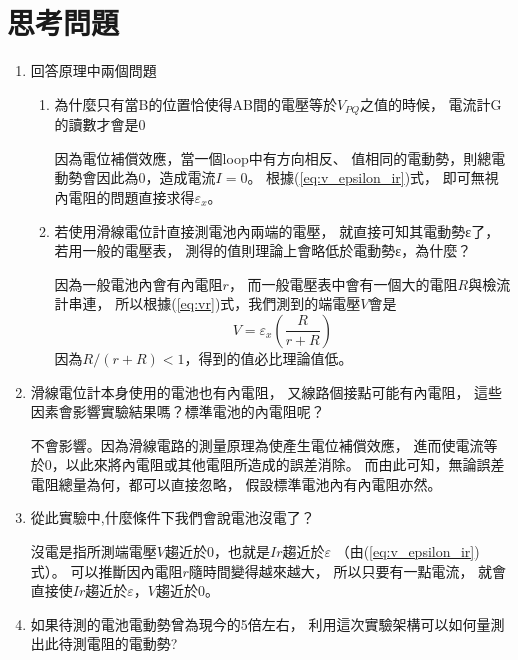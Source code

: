 \documentclass[12pt]{article}
\begin{document}
    \section{思考問題}
        \begin{enumerate}
            \item 回答原理中兩個問題
                \begin{enumerate}[(1)]
                    \item 為什麼只有當B的位置恰使得AB間的電壓等於$V_{PQ}$之值的時候，
                        電流計G的讀數才會是0

                        因為電位補償效應，當一個loop中有方向相反、
                        值相同的電動勢，則總電動勢會因此為0，造成電流$I=0$。
                        根據(\ref{eq:v_epsilon_ir})式，
                        即可無視內電阻的問題直接求得$\varepsilon_x$。 
                    \item 若使用滑線電位計直接測電池內兩端的電壓，
                        就直接可知其電動勢ε了，若用一般的電壓表，
                        測得的值則理論上會略低於電動勢ε，為什麼？
                        
                        因為一般電池內會有內電阻$r$，
                        而一般電壓表中會有一個大的電阻$R$與檢流計串連，
                        所以根據(\ref{eq:vr})式，我們測到的端電壓$V$會是
                        $$V=\varepsilon_x(\frac{R}{r+R})$$
                        因為$R/(r+R)<1$，得到的值必比理論值低。 
                \end{enumerate}
            \item 
                滑線電位計本身使用的電池也有內電阻，
                又線路個接點可能有內電阻，
                這些因素會影響實驗結果嗎？標準電池的內電阻呢？
                
                不會影響。因為滑線電路的測量原理為使產生電位補償效應，
                進而使電流等於0，以此來將內電阻或其他電阻所造成的誤差消除。
                而由此可知，無論誤差電阻總量為何，都可以直接忽略，
                假設標準電池內有內電阻亦然。 
            \item 從此實驗中,什麼條件下我們會說電池沒電了？
                
                沒電是指所測端電壓$V$趨近於0，也就是$Ir$趨近於$\varepsilon$
                （由(\ref{eq:v_epsilon_ir})式）。
                可以推斷因內電阻$r$隨時間變得越來越大，
                所以只要有一點電流，
                就會直接使$Ir$趨近於$\varepsilon$，$V$趨近於0。 
            \item 
                如果待測的電池電動勢曾為現今的5倍左右，
                利用這次實驗架構可以如何量測出此待測電阻的電動勢?


\end{enumerate}
\end{document}
